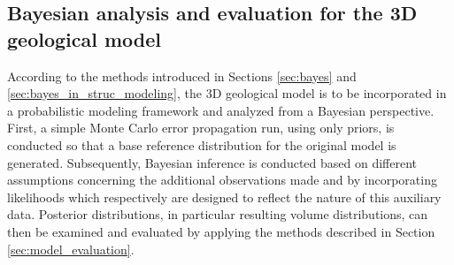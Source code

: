 		\subsection{Bayesian analysis and evaluation for the 3D geological model}
		According to the methods introduced in Sections \ref{sec:bayes} and \ref{sec:bayes_in_struc_modeling}, the 3D geological model is to be incorporated in a probabilistic modeling framework and analyzed from a Bayesian perspective.
		First, a simple Monte Carlo error propagation run, using only priors, is conducted so that a base reference distribution for the original model is generated. Subsequently, Bayesian inference is conducted based on different assumptions concerning the additional observations made and by incorporating likelihoods which respectively are designed to reflect the nature of this auxiliary data. Posterior distributions, in particular resulting volume distributions, can then be examined and evaluated by applying the methods described in Section \ref{sec:model_evaluation}.